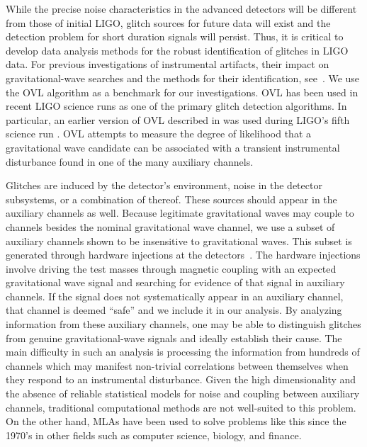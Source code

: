\documentclass[prd, twocolumn, lengthcheck, superscriptaddress, showpacs, letterpaper, nofootinbib]{revtex4-1}
\begin{document}
While the precise noise characteristics in the advanced detectors will be
different from those of initial \ac{LIGO}, glitch sources for future data will
exist and the detection problem for short duration signals will persist. Thus,
it is critical to develop data analysis methods for the robust identification
of glitches in \ac{LIGO} data. For previous investigations of instrumental
artifacts, their impact on gravitational-wave searches and the methods for
their identification,
see~\cite{DiCredico2005,Ajith2007,Blackburn2008,Tomoki2010,Christensen:2010,Slutsky:2010short,Smith:2011an,Virgodetchar2012}.
We use the \ac{OVL} algorithm as a benchmark for our investigations. \ac{OVL}
has been used in recent \ac{LIGO} science runs as one of the primary glitch
detection algorithms. In particular, an earlier version of \ac{OVL} described
in \cite{blackburnthesis} was used during \ac{LIGO}'s fifth science run
\cite{Abbott:2009zi}. \ac{OVL} attempts to measure the degree of likelihood
that a gravitational wave candidate can be associated with a transient
instrumental disturbance found in one of the many auxiliary channels.

Glitches are induced by the detector's environment, noise in the detector
subsystems, or a combination of thereof. These sources should appear in the
auxiliary channels as well. Because legitimate gravitational waves may couple
to channels besides the nominal gravitational wave channel, we use a subset of
auxiliary channels shown to be insensitive to gravitational waves. This subset
is generated through hardware injections at the detectors~\cite{Smith:2011an}.
The hardware injections involve driving the test masses through magnetic
coupling with an expected gravitational wave signal and searching for evidence
of that signal in auxiliary channels. If the signal does not systematically
appear in an auxiliary channel, that channel is deemed ``safe'' and we include
it in our analysis. By analyzing information from these auxiliary channels, one
may be able to distinguish glitches from genuine gravitational-wave signals and
ideally establish their cause. The main difficulty in such an analysis is
processing the information from hundreds of channels which may manifest
non-trivial correlations between themselves when they respond to an
instrumental disturbance. Given the high dimensionality and the absence of
reliable statistical models for noise and coupling between auxiliary channels,
traditional computational methods are not well-suited to this problem. On the
other hand, \ac{MLA}s have been used to solve problems like this since the
1970's in other fields such as computer science, biology, and finance. 
\end{document}
